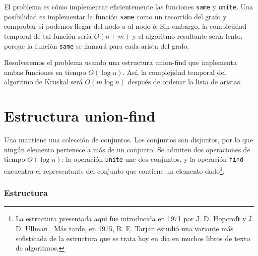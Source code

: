 El problema es cómo implementar eficientemente
las funciones \texttt{same} y \texttt{unite}.
Una posibilidad es implementar la función
\texttt{same} como un recorrido del grafo y comprobar si
podemos llegar del nodo $a$ al nodo $b$.
Sin embargo, la complejidad temporal de tal función
sería $O(n+m)$
y el algoritmo resultante sería lento,
porque la función \texttt{same} se llamará para cada arista del grafo.

Resolveremos el problema usando una estructura union-find
que implementa ambas funciones en tiempo $O(\log n)$.
Así, la complejidad temporal del algoritmo de Kruskal
será $O(m \log n)$ después de ordenar la lista de aristas.

\section{Estructura union-find}


Una  mantiene
una colección de conjuntos.
Los conjuntos son disjuntos, por lo que ningún elemento
pertenece a más de un conjunto.
Se admiten dos operaciones de tiempo $O(\log n)$:
la operación \texttt{unite} une dos conjuntos,
y la operación \texttt{find} encuentra el representante
del conjunto que contiene un elemento dado\footnote{La estructura presentada aquí
fue introducida en 1971 por J. D. Hopcroft y J. D. Ullman \cite{hop71}.
Más tarde, en 1975, R. E. Tarjan estudió una variante más sofisticada
de la estructura \cite{tar75} que se trata hoy en día en muchos
libros de texto de algoritmos.}.

\subsubsection{Estructura}

